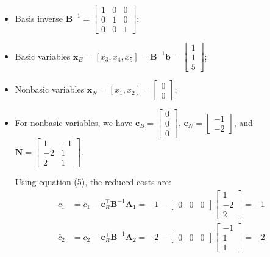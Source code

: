 \documentclass[11pt]{article}
\newcommand{\mb}[1]{\ensuremath{\boldsymbol{#1}}}
\begin{document}
\begin{enumerate}
\begin{itemize}
\item Basis inverse $\mb{B}^{-1} = \begin{bmatrix} 1 & 0 & 0 \\ 0 & 1 & 0 \\ 0 & 0 & 1 \end{bmatrix}$;

\item Basic variables $\mb{x}_B = [x_3, x_4, x_5] = \mb{B}^{-1}\mb{b} = \begin{bmatrix} 1 \\ 1 \\ 5 \end{bmatrix}$;

\item Nonbasic variables $\mb{x}_N = [x_1, x_2] = \begin{bmatrix} 0 \\ 0 \end{bmatrix}$;

\item For nonbasic variables, we have $\mb{c}_B = \begin{bmatrix} 0 \\ 0 \\ 0 \end{bmatrix}$, $\mb{c}_N = \begin{bmatrix} -1 \\ -2 \end{bmatrix}$, and $\mb{N} = \begin{bmatrix} 1 & -1 \\ -2 & 1 \\ 2 & 1 \end{bmatrix}$.

Using equation (5), the reduced costs are:
\begin{align*}
\bar{c}_1 &= c_1 - \mb{c}_B^\top\mb{B}^{-1}\mb{A}_1 = -1 - \begin{bmatrix} 0 & 0 & 0 \end{bmatrix} \begin{bmatrix} 1 \\ -2 \\ 2 \end{bmatrix} = -1 \\
\bar{c}_2 &= c_2 - \mb{c}_B^\top\mb{B}^{-1}\mb{A}_2 = -2 - \begin{bmatrix} 0 & 0 & 0 \end{bmatrix} \begin{bmatrix} -1 \\ 1 \\ 1 \end{bmatrix} = -2
\end{align*}


\end{itemize}
\end{enumerate}
\end{document}
